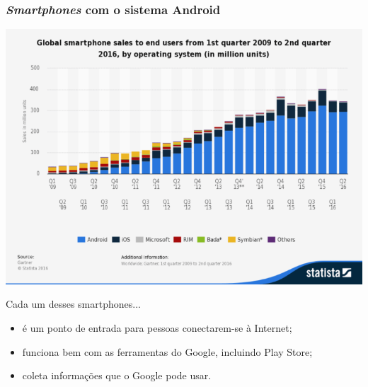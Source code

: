 \documentclass[xcolor=dvipsnames]{beamer}
\begin{document}
\begin{frame}
	\frametitle{\textit{Smartphones} com o sistema Android}
 	\includegraphics[scale=0.30]{android.png}
\pause
	{\footnotesize 
	\begin{block}{Cada um desses smartphones...}	
	\begin{itemize}
	\item é um ponto de entrada para pessoas conectarem-se à Internet;
	\item funciona bem com as ferramentas do Google, incluindo Play Store;
	\item coleta informações que o Google pode usar.
	\end{itemize}
	\end{block}}
\end{frame}
\end{document}
